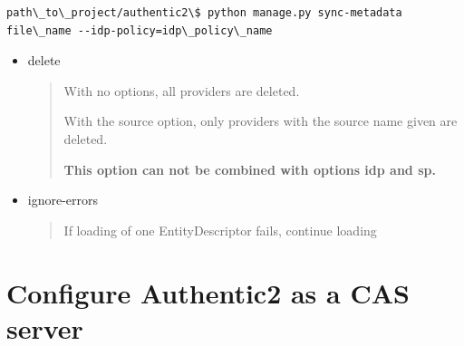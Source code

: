 \documentclass[letterpaper,10pt,english]{sphinxmanual}
\begin{document}
\begin{Verbatim}[commandchars=\\\{\}]
path\_to\_project/authentic2\$ python manage.py sync-metadata file\_name --idp-policy=idp\_policy\_name
\end{Verbatim}
\begin{itemize}
\item {} 
delete
\begin{quote}

With no options, all providers are deleted.

With the source option, only providers with the source name given are deleted.

\textbf{This option can not be combined with options idp and sp.}
\end{quote}

\item {} 
ignore-errors
\begin{quote}

If loading of one EntityDescriptor fails, continue loading
\end{quote}

\end{itemize}


\section{Configure Authentic2 as a CAS server}
\label{config_cas_sp:configure-authentic2-as-a-cas-server}\label{config_cas_sp::doc}\label{config_cas_sp:config-cas-sp}
\end{document}

